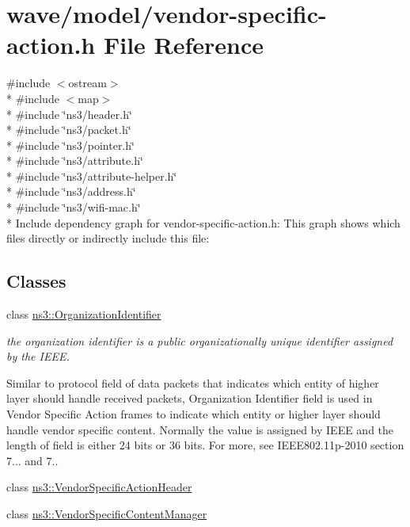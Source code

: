 \hypertarget{vendor-specific-action_8h}{}\section{wave/model/vendor-\/specific-\/action.h File Reference}
\label{vendor-specific-action_8h}
{\ttfamily \#include $<$ostream$>$}\\*
{\ttfamily \#include $<$map$>$}\\*
{\ttfamily \#include \char`\"{}ns3/header.\+h\char`\"{}}\\*
{\ttfamily \#include \char`\"{}ns3/packet.\+h\char`\"{}}\\*
{\ttfamily \#include \char`\"{}ns3/pointer.\+h\char`\"{}}\\*
{\ttfamily \#include \char`\"{}ns3/attribute.\+h\char`\"{}}\\*
{\ttfamily \#include \char`\"{}ns3/attribute-\/helper.\+h\char`\"{}}\\*
{\ttfamily \#include \char`\"{}ns3/address.\+h\char`\"{}}\\*
{\ttfamily \#include \char`\"{}ns3/wifi-\/mac.\+h\char`\"{}}\\*
Include dependency graph for vendor-\/specific-\/action.h\+:
This graph shows which files directly or indirectly include this file\+:
\subsection*{Classes}
\begin{DoxyCompactItemize}
\item 
class \hyperlink{classns3_1_1OrganizationIdentifier}{ns3\+::\+Organization\+Identifier}
\begin{DoxyCompactList}\small\item\em the organization identifier is a public organizationally unique identifier assigned by the I\+E\+EE.

Similar to protocol field of data packets that indicates which entity of higher layer should handle received packets, Organization Identifier field is used in Vendor Specific Action frames to indicate which entity or higher layer should handle vendor specific content. Normally the value is assigned by I\+E\+EE and the length of field is either 24 bits or 36 bits. For more, see I\+E\+E\+E802.\+11p-\/2010 section 7... and 7.. \end{DoxyCompactList}\item 
class \hyperlink{classns3_1_1VendorSpecificActionHeader}{ns3\+::\+Vendor\+Specific\+Action\+Header}
\item 
class \hyperlink{classns3_1_1VendorSpecificContentManager}{ns3\+::\+Vendor\+Specific\+Content\+Manager}
\end{DoxyCompactItemize}
